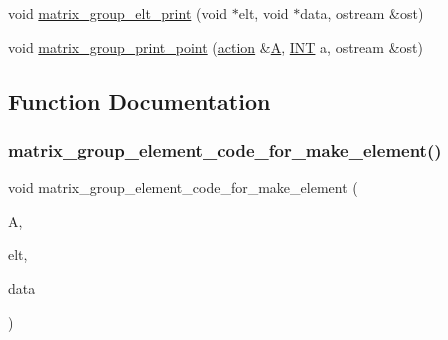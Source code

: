 \begin{DoxyCompactItemize}
\item 
void \mbox{\hyperlink{interface__matrix__group_8_c_ae0fb57c60628c35d335ca6fc3f64714e}{matrix\+\_\+group\+\_\+elt\+\_\+print}} (void $\ast$elt, void $\ast$data, ostream \&ost)
\item 
void \mbox{\hyperlink{interface__matrix__group_8_c_adc53d1d08096c08ec5005c90fa1d2100}{matrix\+\_\+group\+\_\+print\+\_\+point}} (\mbox{\hyperlink{classaction}{action}} \&\mbox{\hyperlink{simeon_8_c_a97833f04c3a9c008df5521a2fc291bb4}{A}}, \mbox{\hyperlink{galois_8h_a09fddde158a3a20bd2dcadb609de11dc}{I\+NT}} a, ostream \&ost)
\end{DoxyCompactItemize}


\subsection{Function Documentation}
\mbox{\label{interface__matrix__group_8_c_ad6f951b50c8813e31f34304c55ccd2d9}} 
\subsubsection{\texorpdfstring{matrix\+\_\+group\+\_\+element\+\_\+code\+\_\+for\+\_\+make\+\_\+element()}{matrix\_group\_element\_code\_for\_make\_element()}}
{\footnotesize\ttfamily void matrix\+\_\+group\+\_\+element\+\_\+code\+\_\+for\+\_\+make\+\_\+element (\begin{DoxyParamCaption}\item[{\mbox{\hyperlink{classaction}{action}} \&}]{A,  }\item[{void $\ast$}]{elt,  }\item[{\mbox{\hyperlink{galois_8h_a09fddde158a3a20bd2dcadb609de11dc}{I\+NT}} $\ast$}]{data }\end{DoxyParamCaption})}

\mbox{\label{interface__matrix__group_8_c_a28120d2087dc07bb997d1aa89319f8fc}} 
